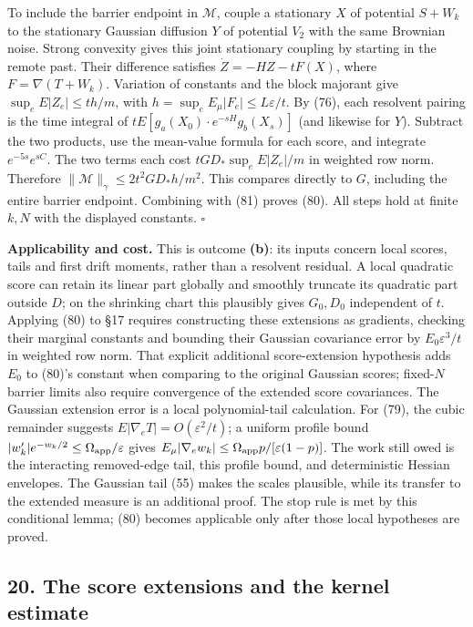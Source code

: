 \documentclass[11pt,a4paper]{article}
\begin{document}
To include the barrier endpoint in \(\mathcal M\), couple a stationary
\(X\) of potential \(S+W_k\) to the stationary Gaussian diffusion \(Y\)
of potential \(V_2\) with the same Brownian noise. Strong convexity
gives this joint stationary coupling by starting in the remote past.
Their difference satisfies \(\dot Z=-HZ-tF(X)\), where
\(F=\nabla(T+W_k)\). Variation of constants and the block majorant give
\(\sup_eE|Z_e|\le th/m\), with \(h=\sup_eE_\mu|F_e|\le L\varepsilon/t\).
By (76), each resolvent pairing is the time integral of
\(tE[g_a(X_0)\cdot e^{-sH}g_b(X_s)]\) (and likewise for \(Y\)). Subtract
the two products, use the mean-value formula for each score, and
integrate \(e^{-5s}e^{sC}\). The two terms each cost
\(tGD_*\sup_eE|Z_e|/m\) in weighted row norm. Therefore
\(\|\mathcal M\|_\gamma\le2t^2GD_*h/m^2\). This compares directly to
\(G\), including the entire barrier endpoint. Combining with (81) proves
(80). All steps hold at finite \(k,N\) with the displayed constants.
\(\square\)

\textbf{Applicability and cost.} This is outcome \textbf{(b)}: its
inputs concern local scores, tails and first drift moments, rather than
a resolvent residual. A local quadratic score can retain its linear part
globally and smoothly truncate its quadratic part outside \(D\); on the
shrinking chart this plausibly gives \(G_0,D_0\) independent of \(t\).
Applying (80) to §17 requires constructing these extensions as
gradients, checking their marginal constants and bounding their Gaussian
covariance error by \(E_0\varepsilon^3/t\) in weighted row norm. That
explicit additional score-extension hypothesis adds \(E_0\) to (80)'s
constant when comparing to the original Gaussian scores; fixed-\(N\)
barrier limits also require convergence of the extended score
covariances. The Gaussian extension error is a local polynomial-tail
calculation. For (79), the cubic remainder suggests
\(E|\nabla_eT|=O(\varepsilon^2/t)\); a uniform profile bound
\(|w_k'|e^{-w_k/2}\le\Omega_{\rm app}/\varepsilon\) gives
\(E_\mu|\nabla_ew_k|\le\Omega_{\rm app}p/[\varepsilon(1-p)]\). The work
still owed is the interacting removed-edge tail, this profile bound, and
deterministic Hessian envelopes. The Gaussian tail (55) makes the scales
plausible, while its transfer to the extended measure is an additional
proof. The stop rule is met by this conditional lemma; (80) becomes
applicable only after those local hypotheses are proved.

\hypertarget{the-score-extensions-and-the-kernel-estimate}{%
\subsection{20. The score extensions and the kernel
estimate}\label{the-score-extensions-and-the-kernel-estimate}}
\end{document}
